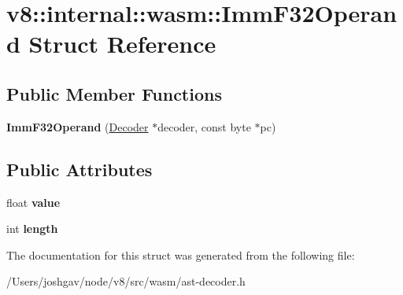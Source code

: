 \hypertarget{structv8_1_1internal_1_1wasm_1_1_imm_f32_operand}{}\section{v8\+:\+:internal\+:\+:wasm\+:\+:Imm\+F32\+Operand Struct Reference}
\label{structv8_1_1internal_1_1wasm_1_1_imm_f32_operand}
\subsection*{Public Member Functions}
\begin{DoxyCompactItemize}
\item 
{\bfseries Imm\+F32\+Operand} (\hyperlink{classv8_1_1internal_1_1wasm_1_1_decoder}{Decoder} $\ast$decoder, const byte $\ast$pc)\hypertarget{structv8_1_1internal_1_1wasm_1_1_imm_f32_operand_a2ddc6d00826039cda6298fa033d3e634}{}\label{structv8_1_1internal_1_1wasm_1_1_imm_f32_operand_a2ddc6d00826039cda6298fa033d3e634}

\end{DoxyCompactItemize}
\subsection*{Public Attributes}
\begin{DoxyCompactItemize}
\item 
float {\bfseries value}\hypertarget{structv8_1_1internal_1_1wasm_1_1_imm_f32_operand_a005ae749b353b73e1fa9405dd01ba032}{}\label{structv8_1_1internal_1_1wasm_1_1_imm_f32_operand_a005ae749b353b73e1fa9405dd01ba032}

\item 
int {\bfseries length}\hypertarget{structv8_1_1internal_1_1wasm_1_1_imm_f32_operand_a7e8ffc8fcc9fe8333bea3f0e6185fab5}{}\label{structv8_1_1internal_1_1wasm_1_1_imm_f32_operand_a7e8ffc8fcc9fe8333bea3f0e6185fab5}

\end{DoxyCompactItemize}


The documentation for this struct was generated from the following file\+:\begin{DoxyCompactItemize}
\item 
/\+Users/joshgav/node/v8/src/wasm/ast-\/decoder.\+h\end{DoxyCompactItemize}
